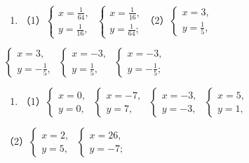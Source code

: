 \begin{enumerate}[start=3]
\item
  （1）\(\left\{ \begin{array}{l} x = \frac{1}{64}, \\ y = \frac{1}{16}, \end{array} \right.\) \(\left\{ \begin{array}{l} x = \frac{1}{16}, \\ y = \frac{1}{64}; \end{array} \right.\)（2）\(\left\{ \begin{array}{l} x = 3, \\ y = \frac{1}{5}, \end{array} \right.\)
\end{enumerate}

\(\left\{ \begin{array}{l} x = 3, \\ y = -\frac{1}{5}, \end{array} \right.\) \(\left\{ \begin{array}{l} x = -3, \\ y = \frac{1}{5}, \end{array} \right.\) \(\left\{ \begin{array}{l} x = -3, \\ y = -\frac{1}{5}; \end{array} \right.\)

\begin{enumerate}[start=4]
\item
  （1）\(\left\{ \begin{array}{l} x = 0, \\ y = 0, \end{array} \right.\) \(\left\{ \begin{array}{l} x = -7, \\ y = 7, \end{array} \right.\) \(\left\{ \begin{array}{l} x = -3, \\ y = -3, \end{array} \right.\) \(\left\{ \begin{array}{l} x = 5, \\ y = 1, \end{array} \right.\)
\end{enumerate}

（2）\(\left\{ \begin{array}{l} x = 2, \\ y = 5, \end{array} \right.\) \(\left\{ \begin{array}{l} x = 26, \\ y = -7; \end{array} \right.\)

